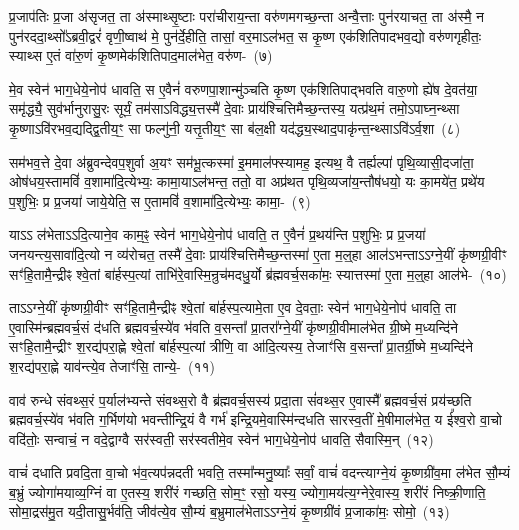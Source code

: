 प्र॒जा\-प॑तिः प्र॒जा अ॑सृजत॒ ता अ॑स्माथ्सृ॒ष्टाः परा॑चीराय॒न्ता वरु॑णमगच्छ॒न्ता अन्वै॒त्ताः पुन॑रयाचत॒ ता अ॑स्मै॒ न पुन॑रददा॒थ्सो᳚\-ऽब्रवी॒द्वरं॑ वृणी॒ष्वाथ॑ मे॒ पुन॑र्दे॒हीति॒ तासां॒ वर॒मा\-ऽल॑भत॒ स कृ॒ष्ण एक॑शितिपादभव॒द्यो वरु॑णगृहीतः॒ स्याथ्स ए॒तं वा॑रु॒णं कृ॒ष्णमेक॑शितिपाद॒मा\-ल॑भेत॒ वरु॑ण-~(७)\ip

मे॒व स्वेन॑ भाग॒\-धेये॒नोप॑ धावति॒ स ए॒वैनं॑ वरुणपा॒शान्मु॑ञ्चति कृ॒ष्ण एक॑शितिपाद्भवति वारु॒णो ह्ये॑ष दे॒वत॑या॒ समृ॑द्ध्यै॒ सुव॑र्भानुरासु॒रः सूर्यं॒ तम॑सा\-ऽविद्ध्य॒त्तस्मै॑ दे॒वाः प्राय॑श्चित्तिमैच्छ॒न्तस्य॒ यत्प्र॑थ॒मं तमो॒\-ऽपाघ्न॒न्थ्सा कृ॒ष्णा\-ऽवि॑रभव॒द्यद्द्वि॒तीय॒ꣳ॒ सा फल्गु॑नी॒ यत्तृ॒तीय॒ꣳ॒ सा ब॑ल॒क्षी यद॑द्ध्य॒स्थाद॒पाकृ॑न्त॒न्थ्सा\-ऽवि॑\-ऽर्व॒शा~(८)\ip

सम॑भव॒त्ते दे॒वा अ॑ब्रुवन्देवप॒शुर्वा अ॒यꣳ सम॑भू॒त्कस्मा॑ इ॒ममाल॑फ्स्यामह॒ इत्यथ॒ वै तर्ह्यल्पा॑ पृथि॒व्यासी॒दजा॑ता॒ ओष॑धय॒स्तामविं॑ व॒शामा॑दि॒त्येभ्यः॒ कामा॒या\-ऽल॑भन्त॒ ततो॒ वा अप्र॑थत पृथि॒व्यजा॑य॒न्तौष॑धयो॒ यः का॒मये॑त॒ प्रथे॑य प॒शुभिः॒ प्र प्र॒जया॑ जाये॒येति॒ स ए॒तामविं॑ व॒शामा॑दि॒त्येभ्यः॒ कामा॒-~(९)\ip

या\-ऽऽ ल॑भेता\-ऽऽ\-दि॒त्याने॒व काम॒ꣴ॒ स्वेन॑ भाग॒\-धेये॒नोप॑ धावति॒ त ए॒वैनं॑ प्र॒थय॑न्ति प॒शुभिः॒ प्र प्र॒जया॑ जनयन्त्य॒सावा॑दि॒त्यो न व्य॑रोचत॒ तस्मै॑ दे॒वाः प्राय॑श्चित्तिमैच्छ॒न्तस्मा॑ ए॒ता म॒ल्॒\mbox{}हा आल॑\-ऽभन्ता\-ऽऽ\-ग्ने॒यीं कृ॑ष्णग्री॒वीꣳ सꣳ॑हि॒तामै॒न्द्रीꣴ श्वे॒तां बा॑र्\mbox{}हस्प॒त्यां ताभि॑रे॒वास्मि॒न्रुच॑मदधु॒र्यो ब्र॑ह्मवर्च॒सका॑मः॒ स्यात्तस्मा॑ ए॒ता म॒ल्॒\mbox{}हा आल॑भे-~(१०)\ip

ता\-ऽऽ\-ग्ने॒यीं कृ॑ष्णग्री॒वीꣳ सꣳ॑हि॒तामै॒न्द्रीꣴ श्वे॒तां बा॑र्\mbox{}हस्प॒त्या\-मे॒ता ए॒व दे॒वताः॒ स्वेन॑ भाग॒\-धेये॒नोप॑ धावति॒ ता ए॒वास्मि॑न्ब्रह्मवर्च॒सं द॑धति ब्रह्मवर्च॒स्ये॑व भ॑वति व॒सन्ता᳚ प्रा॒तरा᳚ग्ने॒यीं कृ॑ष्णग्री॒वीमाल॑भेत ग्री॒ष्मे म॒ध्यन्दि॑ने सꣳहि॒तामै॒न्द्रीꣳ श॒रद्य॑परा॒ह्णे श्वे॒तां बा॑र्\mbox{}हस्प॒त्यां त्रीणि॒ वा आ॑दि॒त्यस्य॒ तेजाꣳ॑सि व॒सन्ता᳚ प्रा॒तर्ग्री॒ष्मे म॒ध्यन्दि॑ने श॒रद्य॑परा॒ह्णे याव॑न्त्ये॒व तेजाꣳ॑सि॒ तान्ये॒-~(११)\ip

वाव॑ रुन्धे संवथ्स॒रं प॒र्याल॑भ्यन्ते संवथ्स॒रो वै ब्र॑ह्मवर्च॒सस्य॑ प्रदा॒ता सं॑वथ्स॒र ए॒वास्मै᳚ ब्रह्मवर्च॒सं प्रय॑च्छति ब्रह्मवर्च॒स्ये॑व भ॑वति ग॒र्भिण॑यो भवन्तीन्द्रि॒यं वै गर्भ॑ इन्द्रि॒यमे॒वास्मि॑न्दधति सारस्व॒तीं मे॒षीमा\-ल॑भेत॒ य ई᳚श्व॒रो वा॒चो वदि॑तोः॒ सन्वाचं॒ न वदे॒द्वाग्वै सर॑स्वती॒ सर॑स्वतीमे॒व स्वेन॑ भाग॒\-धेये॒नोप॑ धावति॒ सैवास्मि॒न्~(१२)\ip

वाचं॑ दधाति प्रवदि॒ता वा॒चो भ॑व॒त्यप॑न्नदती भवति॒ तस्मा᳚न्मनु॒ष्याः᳚ सर्वां॒ वाचं॑ वदन्त्याग्ने॒यं कृ॒ष्णग्री॑व॒मा ल॑भेत सौ॒म्यं ब॒भ्रुं ज्योगा॑मयाव्य॒ग्निं वा ए॒तस्य॒ शरी॑रं गच्छति॒ सोम॒ꣳ॒ रसो॒ यस्य॒ ज्योगा॒मय॑त्य॒ग्नेरे॒वास्य॒ शरी॑रं निष्क्री॒णाति॒ सोमा॒द्रस॑मु॒त यदी॒तासु॒र्भव॑ति॒ जीव॑त्ये॒व सौ॒म्यं ब॒भ्रुमा\-ल॑भेता\-ऽऽ\-ग्ने॒यं कृ॒ष्णग्री॑वं प्र॒जाका॑मः॒ सोमो॒~(१३)\ip

